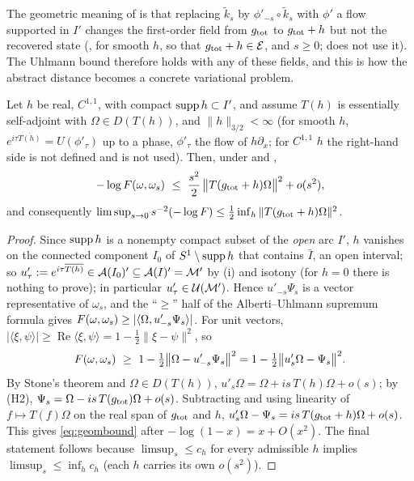 The geometric meaning of  is that replacing $\tilde k_{s}$ by $\phi'_{-s}\circ\tilde k_{s}$
with $\phi'$ a flow supported in $I'$ changes the first-order field from $g_{\rm tot}$ to
$g_{\rm tot}+h$ but not the recovered state (, for smooth $h$, so that $g_{\rm tot}+h\in\mathcal E$, and $s\ge0$;  does not use it).  The Uhlmann bound therefore holds with any
of these fields, and this is how the abstract distance becomes a concrete variational problem.

\begin{proposition}\label{prop:geom}
Let $h$ be real, $C^{1,1}$, with compact $\operatorname{supp} h\subset I'$, and assume $T(h)$ is essentially self-adjoint
with $\Omega\in D(T(h))$, and $\|h\|_{3/2}<\infty$ (for smooth $h$, $e^{i\tau\overline{T(h)}}=U(\phi'_{\tau})$ up to a phase, $\phi'_{\tau}$ the flow of $h\partial_{x}$; for $C^{1,1}$ $h$ the right-hand side is not defined and is not used).
Then, under  and ,
\begin{equation}\label{eq:geombound}
 -\log F(\omega,\omega_{s})\ \le\ \frac{s^{2}}{2}\,\bigl\|T(g_{\rm tot}+h)\Omega\bigr\|^{2}+o(s^{2}),
\end{equation}
and consequently $\limsup_{s\to0}s^{-2}(-\log F)\le\frac12\inf_{h}\|T(g_{\rm tot}+h)\Omega\|^{2}$.
\end{proposition}

\begin{proof}
Since $\operatorname{supp} h$ is a nonempty compact subset of the \emph{open} arc $I'$, $h$ vanishes on the connected
component $I_{0}$ of $S^{1}\setminus\operatorname{supp} h$ that contains $\bar I$, an open interval; so
$u'_{\tau}:=e^{i\tau\overline{T(h)}}\in\mathcal A(I_{0})'\subseteq\mathcal A(I)'=\mathcal M'$ by (i) and isotony
(for $h=0$ there is nothing to prove); in particular $u'_{\tau}\in\mathcal U(\mathcal M')$.  Hence $u'_{-s}\Psi_{s}$ is a vector representative of
$\omega_{s}$, and the ``$\ge$'' half of the Alberti--Uhlmann supremum formula \cite[Theorem 2(3)]{AU02}
gives $F(\omega,\omega_{s})\ge|\langle\Omega,u'_{-s}\Psi_{s}\rangle|$.  For unit vectors,
$|\langle\xi,\psi\rangle|\ge\operatorname{Re}\langle\xi,\psi\rangle=1-\frac12\|\xi-\psi\|^{2}$, so
\[
 \Fid(\omega,\omega_{s})\ \ge\ 1-\tfrac12\bigl\|\Omega-u'_{-s}\Psi_{s}\bigr\|^{2}
 =1-\tfrac12\bigl\|u'_{s}\Omega-\Psi_{s}\bigr\|^{2}.
\]
By Stone's theorem and $\Omega\in D(T(h))$, $u'_{s}\Omega=\Omega+is\,T(h)\Omega+o(s)$; by (H2),
$\Psi_{s}=\Omega-is\,T(g_{\rm tot})\Omega+o(s)$.  Subtracting and using linearity of
$f\mapsto T(f)\Omega$ on the real span of $g_{\rm tot}$ and $h$,
$u'_{s}\Omega-\Psi_{s}=is\,T(g_{\rm tot}+h)\Omega+o(s)$.  This gives \eqref{eq:geombound} after
$-\log(1-x)=x+O(x^{2})$.  The final statement follows because $\limsup_{s}\le c_{h}$ for every admissible
$h$ implies $\limsup_{s}\le\inf_{h}c_{h}$ (each $h$ carries its own $o(s^{2})$).
\end{proof}

